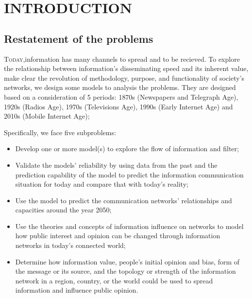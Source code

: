 \section  {INTRODUCTION}

\subsection{Restatement of the problems}
\par
\lettrine[lines=2]{T}{oday},information has many channels to spread and to be recieved. To explore the relationship between information's disseminating speed and its inherent value, make clear the revolution of methodology, purpose, and functionality of society's networks, we design some models to analysis the problems. They are designed based on a consideration of 5 periods: 1870s (Newspapers and Telegraph Age), 1920s (Radios Age), 1970s (Televisions Age), 1990s (Early Internet Age) and 2010s (Mobile Internet Age); 

\par Specifically, we face five subproblems:
\begin{itemize}
\item Develop one or more model(s) to explore the flow of information and filter;
\item Validate the models' reliability by using data from the past and the prediction capability of the model to predict the information communication situation for today and compare that with today's reality;
\item Use the model to predict the communication networks' relationships and capacities around the year 2050;

\item Use the theories and concepts of information influence on networks to model how public interest and opinion can be changed through information networks in today's connected world;

\item Determine how information value, people's initial opinion and bias, form of the message or its source, and the topology or strength of the information network in a region, country, or the world could be used to spread information and influence public opinion. 
\end{itemize}


